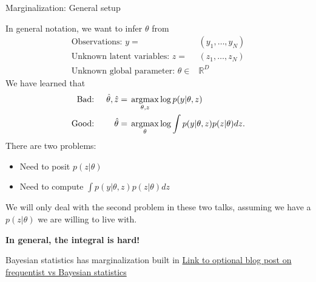 

\begin{frame}{Marginalization: General setup}

In general notation, we want to infer $\theta$ from
%
\begin{align*}
    \textrm{Observations: }y ={}& (y_1, \ldots, y_N)\\
    \textrm{Unknown latent variables: }z ={}& (z_1, \ldots, z_N)\\
    \textrm{Unknown global parameter: }\theta \in{}& \mathbb{R}^D
\end{align*}
%
We have learned that
%
\begin{align*}
%
\textrm{Bad: }&& \thetahat, \hat{z} ={}& \argmax_{\theta, z} \log p(y | \theta, z)\\
\textrm{Good: }&& \thetahat ={}&
    \argmax_{\theta} \log \int p(y | \theta, z) p(z | \theta) dz.
%
\end{align*}
%
\pause
%
There are two problems:
%
\begin{itemize}
    \item Need to posit $p(z | \theta)$
    \item Need to compute $\int p(y | \theta, z) p(z | \theta) dz$
\end{itemize}
%

We will only deal with the second problem in these two talks, assuming
we have a $p(z | \theta)$ we are willing to live with.

\textbf{In general, the integral is hard!}


\end{frame}




\begin{frame}{Bayesian statistics has marginalization built in}
    \href{https://rgiordan.github.io/bayes/2019/08/30/bayesian_as_inverse_problem.html}{Link to optional blog post on frequentist vs Bayesian statistics}
\end{frame}

